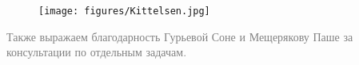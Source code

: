 \phantom{42}

\phantom{42}

\phantom{42}

\hspace{20 mm} 

\phantom{42}


\begin{figure}[h]
    \centering
    \texttt{[image: figures/Kittelsen.jpg]}
\end{figure}


\begin{flushright}
    \textcolor{gray}{
    \small{Также выражаем благодарность Гурьевой Соне и Мещерякову Паше за консультации по отдельным задачам.}}
\end{flushright}


\newpage

\tableofcontents
\newpage